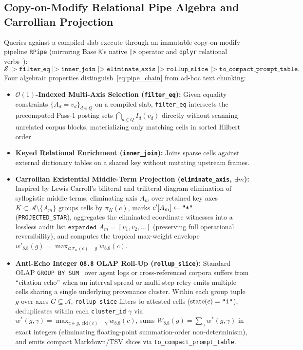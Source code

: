 \documentclass[11pt]{article}
\theoremstyle{plain}
\theoremstyle{definition}
\begin{document}
\subsection{Copy-on-Modify Relational Pipe Algebra and Carrollian Projection}

Queries against a compiled slab execute through an immutable copy-on-modify pipeline \texttt{RPipe} (mirroring Base \texttt{R}'s native \texttt{|>} operator and \texttt{dplyr} relational verbs~\cite{ihaka1996r,wickham2019tidyverse}):
\begin{equation}\label{eq:pipe_chain}
  \mathcal{S} \;\texttt{|>} \; \mathtt{filter\_eq} \;\texttt{|>} \; \mathtt{inner\_join} \;\texttt{|>} \; \mathtt{eliminate\_axis} \;\texttt{|>} \; \mathtt{rollup\_slice} \;\texttt{|>} \; \mathtt{to\_compact\_prompt\_table}.
\end{equation}
Four algebraic properties distinguish~\eqref{eq:pipe_chain} from ad-hoc text chunking:
\begin{itemize}
  \item \textbf{$\mathcal{O}(1)$-Indexed Multi-Axis Selection (\texttt{filter\_eq}):} Given equality constraints $\{A_d = v_d\}_{d \in Q}$ on a compiled slab, \texttt{filter\_eq} intersects the precomputed Pass-1 posting sets $\bigcap_{d \in Q} I_d(v_d)$ directly without scanning unrelated corpus blocks, materializing only matching cells in sorted Hilbert order.
  \item \textbf{Keyed Relational Enrichment (\texttt{inner\_join}):} Joins sparse cells against external dictionary tables on a shared key without mutating upstream frames.
  \item \textbf{Carrollian Existential Middle-Term Projection (\texttt{eliminate\_axis}, $\exists m$):} Inspired by Lewis Carroll's biliteral and triliteral diagram elimination of syllogistic middle terms, eliminating axis $A_m$ over retained key axes $K \subset \mathcal{A} \setminus \{A_m\}$ groups cells by $\pi_K(c)$, marks $c'[A_m] \leftarrow \text{\texttt{"*"}}$ (\texttt{PROJECTED\_STAR}), aggregates the eliminated coordinate witnesses into a lossless audit list $\mathtt{expanded\_}A_m = [v_1, v_2, \dots]$ (preserving full operational reversibility), and computes the tropical max-weight envelope $w'_{8.8}(g) = \max_{c : \pi_K(c) = g} w_{8.8}(c)$.
  \item \textbf{Anti-Echo Integer \texttt{Q8.8} OLAP Roll-Up (\texttt{rollup\_slice}):} Standard OLAP \texttt{GROUP BY SUM}~\cite{gray1997datacube} over agent logs or cross-referenced corpora suffers from ``citation echo'' when an interval spread or multi-step retry emits multiple cells sharing a single underlying provenance cluster. Within each group tuple $g$ over axes $G \subseteq \mathcal{A}$, \texttt{rollup\_slice} filters to attested cells ($\mathrm{state}(c) = \text{\texttt{"1"}}$), deduplicates within each \texttt{cluster\_id} $\gamma$ via $w^*(g, \gamma) = \max_{c \in g,\, \mathrm{cid}(c)=\gamma} w_{8.8}(c)$, sums $W_{8.8}(g) = \sum_{\gamma} w^*(g, \gamma)$ in exact integers (eliminating floating-point summation-order non-determinism), and emits compact Markdown/TSV slices via \texttt{to\_compact\_prompt\_table}.
\end{itemize}
\end{document}
